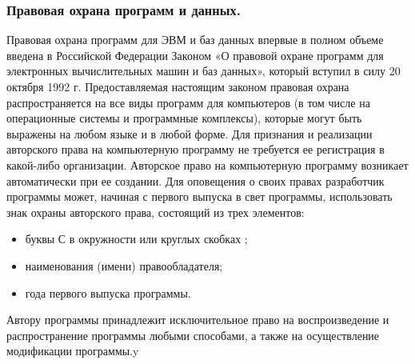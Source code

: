 \documentclass[a4paper]{article}
\begin{document}
\subsubsection{Правовая охрана программ и данных.}

Правовая охрана программ для ЭВМ и баз данных впервые в полном объеме введена в Российской Федерации Законом «О правовой охране программ для электронных вычислительных машин и баз данных», который вступил в силу 20 октября 1992 г. Предоставляемая настоящим законом правовая охрана распространяется на все виды программ для компьютеров (в том числе на операционные системы и программные комплексы), которые могут быть выражены на любом языке и в любой форме. Для признания и реализации авторского права на компьютерную программу не требуется ее регистрация в какой-либо организации. Авторское право на компьютерную программу возникает автоматически при ее создании. Для оповещения о своих правах разработчик программы может, начиная с первого выпуска в свет программы, использовать знак охраны авторского права, состоящий из трех элементов:

\begin{itemize}
\item буквы С в окружности или круглых скобках \textcopyright;
\item наименования (имени) правообладателя;
\item года первого выпуска программы.       
\end{itemize}
Автору программы принадлежит исключительное право на воспроизведение и распространение программы любыми способами, а также на осуществление модификации программы.y
\end{document}
